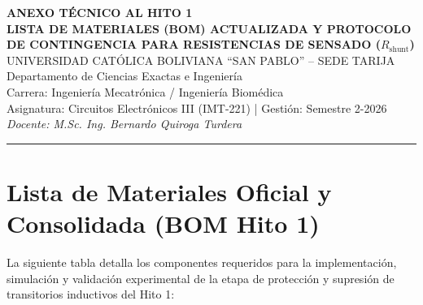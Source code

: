 \documentclass[11pt, a4paper]{article}
\begin{document}
\begin{center}
    {\LARGE \textbf{ANEXO TÉCNICO AL HITO 1}}\\[0.2cm]
    {\Large \textbf{LISTA DE MATERIALES (BOM) ACTUALIZADA Y PROTOCOLO DE CONTINGENCIA PARA RESISTENCIAS DE SENSADO ($R_{\text{shunt}}$)}}\\[0.4cm]
    
    UNIVERSIDAD CATÓLICA BOLIVIANA ``SAN PABLO'' -- SEDE TARIJA\\[0.1cm]
    Departamento de Ciencias Exactas e Ingeniería\\[0.1cm]
    Carrera: Ingeniería Mecatrónica / Ingeniería Biomédica\\[0.1cm]
    Asignatura: Circuitos Electrónicos III (IMT-221) | Gestión: Semestre 2-2026\\[0.1cm]
    \textit{Docente: M.Sc. Ing. Bernardo Quiroga Turdera}
    \vspace{0.3cm}
    \hrule
\end{center}

\vspace{0.4cm}

\section{Lista de Materiales Oficial y Consolidada (BOM Hito 1)}

La siguiente tabla detalla los componentes requeridos para la implementación, simulación y validación experimental de la etapa de protección y supresión de transitorios inductivos del Hito 1:
\end{document}

